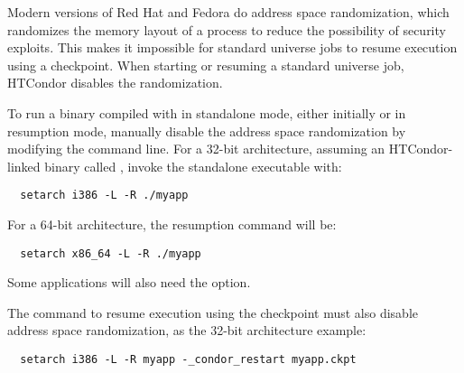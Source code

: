 Modern versions of Red Hat and Fedora do address space randomization,
which randomizes the memory layout of a process
to reduce the possibility of security exploits. 
This makes it impossible
for standard universe jobs to resume execution using a checkpoint.
When starting or resuming a standard universe job,
HTCondor disables the randomization.

To run a binary compiled with   in standalone mode,
either initially or in resumption mode,
manually disable the address space randomization by modifying the
command line.
For a 32-bit architecture, assuming an
HTCondor-linked binary called ,
invoke the standalone executable with:
\begin{verbatim}
  setarch i386 -L -R ./myapp
\end{verbatim}
For a 64-bit architecture, the resumption command will be: 
\begin{verbatim}
  setarch x86_64 -L -R ./myapp
\end{verbatim}
Some applications will also need the  option.

The command to resume execution using the checkpoint must also
disable address space randomization, 
as the 32-bit architecture example:
\begin{verbatim}
  setarch i386 -L -R myapp -_condor_restart myapp.ckpt
\end{verbatim}


